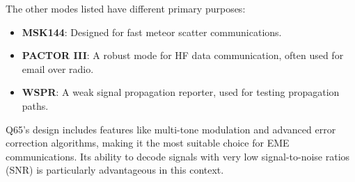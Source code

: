 The other modes listed have different primary purposes:
\begin{itemize}
    \item \textbf{MSK144}: Designed for fast meteor scatter communications.
    \item \textbf{PACTOR III}: A robust mode for HF data communication, often used for email over radio.
    \item \textbf{WSPR}: A weak signal propagation reporter, used for testing propagation paths.
\end{itemize}

Q65’s design includes features like multi-tone modulation and advanced error correction algorithms, making it the most suitable choice for EME communications. Its ability to decode signals with very low signal-to-noise ratios (SNR) is particularly advantageous in this context.

